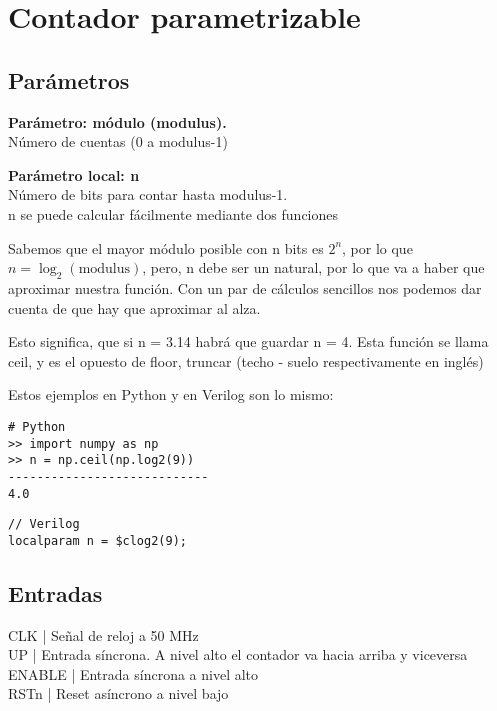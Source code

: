 \documentclass{article}
\newcommand{\iconpath}{/home/khz/git/tabler-icons/icons/outline-white/}
\newcommand{\icon}[1]{}
\begin{document}
\section{Contador parametrizable}
\subsection{Parámetros}
\begin{flushleft}
\textbf{Parámetro: módulo (modulus).} \\
Número de cuentas (0 a modulus-1) \\
\end{flushleft}
\begin{flushleft}
\textbf{Parámetro local: n} \\
Número de bits para contar hasta modulus-1. \\
n se puede calcular fácilmente mediante dos funciones \\
    
\end{flushleft}
Sabemos que el mayor módulo posible con n bits es $2^n$, por lo que $n = \log_2 (\text{modulus})$, pero, n debe ser un natural, por lo que va a haber que aproximar nuestra función. Con un par de cálculos sencillos nos podemos dar cuenta de que hay que aproximar al alza. \\

\begin{flushleft}
Esto significa, que si n = 3.14 habrá que guardar n = 4. Esta función se llama ceil, y es el opuesto de floor, truncar (techo - suelo respectivamente en inglés) \\
\end{flushleft}
Estos ejemplos en Python y en Verilog son lo mismo:

\begin{lstlisting}[style=python]
# Python
>> import numpy as np 
>> n = np.ceil(np.log2(9))
----------------------------
4.0
\end{lstlisting}

\begin{lstlisting}[style=verilog]
// Verilog
localparam n = $clog2(9);
\end{lstlisting}

\subsection{Entradas}
\icon{clock} \icon{s-turn-up} CLK | Señal de reloj a 50 MHz \\
\icon{clock} \icon{s-turn-up} UP | Entrada síncrona. A nivel alto el contador va hacia arriba y viceversa \\
\icon{clock} \icon{s-turn-up} ENABLE | Entrada síncrona a nivel alto \\
\icon{clock-off} \icon{s-turn-down} RSTn | Reset asíncrono a nivel bajo \\
\end{document}
